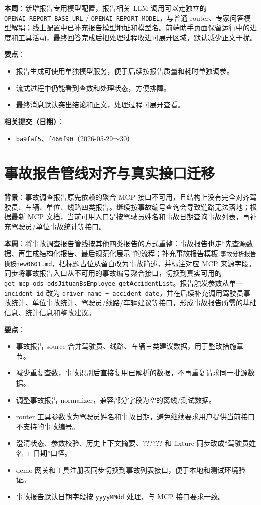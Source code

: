 \documentclass[UTF8]{ctexart}
\begin{document}
\textbf{本周}：新增报告专用模型配置，报告相关 LLM 调用可以走独立的 \texttt{OPENAI\_REPORT\_BASE\_URL} / \texttt{OPENAI\_REPORT\_MODEL}，与普通 router、专家问答模型解耦；线上配置中已补充报告模型地址和模型名。前端助手页面保留运行中的进度和工具活动，最终回答完成后把处理过程收进可展开区域，默认减少正文干扰。

\textbf{要点}：
\begin{itemize}
\item 报告生成可使用单独模型服务，便于后续按报告质量和耗时单独调参。
\item 流式过程中仍能看到查数和处理状态，方便排障。
\item 最终消息默认突出结论和正文，处理过程可展开查看。
\end{itemize}

\textbf{相关提交（日期）}：
\begin{itemize}
\item \texttt{ba9faf5}、\texttt{f466f90}（2026-05-29～30）
\end{itemize}

\section{事故报告管线对齐与真实接口迁移}

\textbf{背景}：事故调查报告原先依赖的聚合 MCP 接口不可用，且结构上没有完全对齐驾驶员、车辆、单位、线路四类报告。继续按事故编号查询会导致链路无法落地；根据最新 MCP 文档，当前可用入口是按驾驶员姓名和事故日期查询事故列表，再补充驾驶员/单位事故统计等接口。

\textbf{本周}：将事故调查报告管线按其他四类报告的方式重整：事故报告也走“先查源数据、再生成结构化报告、最后规范化展示”的流程；补充事故报告模板 \texttt{事故分析报告模板new0601.md}，把标题占位从留白改为事故简述，并标注对应 MCP 来源字段。同步将事故报告入口从不可用的事故编号聚合接口，切换到真实可用的 \texttt{get\_mcp\_ods\_odsJituanBsEmployee\_getAccidentList}。报告触发参数从单一 \texttt{incident\_id} 改为 \texttt{driver\_name + accident\_date}，并在后续补充调用驾驶员事故统计、单位事故统计、驾驶员/线路/车辆建议等接口，形成事故报告所需的基础信息、统计信息和整改建议。

\textbf{要点}：
\begin{itemize}
\item 事故报告 source 合并驾驶员、线路、车辆三类建议数据，用于整改措施章节。
\item 减少重复查数，事故识别后直接复用已解析的数据，不再重复请求同一批源数据。
\item 调整事故报告 normalizer，兼容部分字段为空的离线/测试数据。
\item router 工具参数改为驾驶员姓名和事故日期，避免继续要求用户提供当前接口不支持的事故编号。
\item 澄清状态、参数校验、历史上下文摘要、?????? 和 fixture 同步改成“驾驶员姓名 + 日期”口径。
\item demo 网关和工具注册表同步切换到事故列表接口，便于本地和测试环境验证。
\item 事故报告默认日期字段按 \texttt{yyyyMMdd} 处理，与 MCP 接口要求一致。
\end{itemize}
\end{document}
